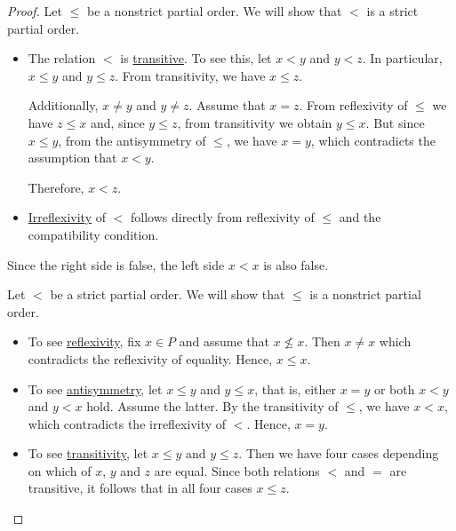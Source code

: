 \begin{proof}
   Let \( \leq \) be a nonstrict partial order. We will show that \( < \) is a strict partial order.

  \begin{itemize}
    \item The relation \( < \) is \hyperref[def:binary_relation/transitive]{transitive}. To see this, let \( x < y \) and \( y < z \). In particular, \( x \leq y \) and \( y \leq z \). From transitivity, we have \( x \leq z \).

    Additionally, \( x \neq y \) and \( y \neq z \). Assume that \( x = z \). From reflexivity of \( \leq \) we have \( z \leq x \) and, since \( y \leq z \), from transitivity we obtain \( y \leq x \). But since \( x \leq y \), from the antisymmetry of \( \leq \), we have \( x = y \), which contradicts the assumption that \( x < y \).

    Therefore, \( x < z \).

    \item \hyperref[def:binary_relation/irreflexive]{Irreflexivity} of \( < \) follows directly from reflexivity of \( \leq \) and the compatibility condition.
  \end{itemize}

  Since the right side is false, the left side \( x < x \) is also false.

   Let \( < \) be a strict partial order. We will show that \( \leq \) is a nonstrict partial order.

  \begin{itemize}
    \item To see \hyperref[def:binary_relation/reflexive]{reflexivity}, fix \( x \in P \) and assume that \( x \not\leq x \). Then \( x \neq x \) which contradicts the reflexivity of equality. Hence, \( x \leq x \).

    \item To see \hyperref[def:binary_relation/antisymmetric]{antisymmetry}, let \( x \leq y \) and \( y \leq x \), that is, either \( x = y \) or both \( x < y \) and \( y < x \) hold. Assume the latter. By the transitivity of \( \leq \), we have \( x < x \), which contradicts the irreflexivity of \( < \). Hence, \( x = y \).

    \item To see \hyperref[def:binary_relation/transitive]{transitivity}, let \( x \leq y \) and \( y \leq z \). Then we have four cases depending on which of \( x \), \( y \) and \( z \) are equal. Since both relations \( < \) and \( = \) are transitive, it follows that in all four cases \( x \leq z \).
  \end{itemize}
\end{proof}

